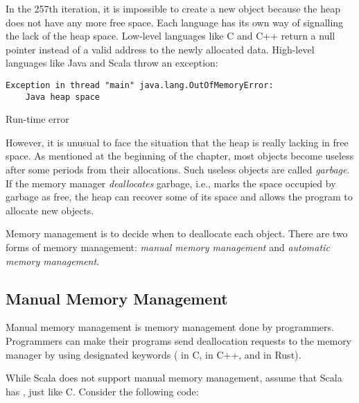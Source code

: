 In the 257th iteration, it is impossible to create a new object because the heap
does not have any more free space. Each language has its own way of signalling
the lack of the heap space. Low-level languages like C and C++ return a null
pointer instead of a valid address to the newly allocated data. High-level
languages like Java and Scala throw an exception:

\begin{mdframed}[hidealllines=true,backgroundcolor=red!10,innerleftmargin=3pt,innerrightmargin=3pt,leftmargin=-3pt,rightmargin=-3pt]
\begin{verbatim}
Exception in thread "main" java.lang.OutOfMemoryError:
    Java heap space
\end{verbatim}
\vspace{-2em}
\begin{flushright}
\scriptsize\textsf{Run-time error}
\end{flushright}
\end{mdframed}

However, it is unusual to face the situation that the heap is really lacking in
free space. As mentioned at the beginning of the chapter, most objects become
useless after some periods from their allocations. Such useless objects are
called \textit{garbage}. If the memory manager
\textit{deallocates} garbage, i.e., marks the space occupied
by garbage as free, the heap can recover some of its space and allows the
program to allocate new objects.

Memory management is to decide when to deallocate each object.  There are two
forms of memory management: \textit{manual memory management} and \textit{automatic memory management}.

\subsection{Manual Memory Management}

Manual memory management is memory management done by programmers. Programmers
can make their programs send deallocation requests to the memory manager by
using designated keywords
( in C,
 in C++,
and  in Rust).

While Scala does not support manual memory management, assume that Scala has
, just like C. Consider the following code:

